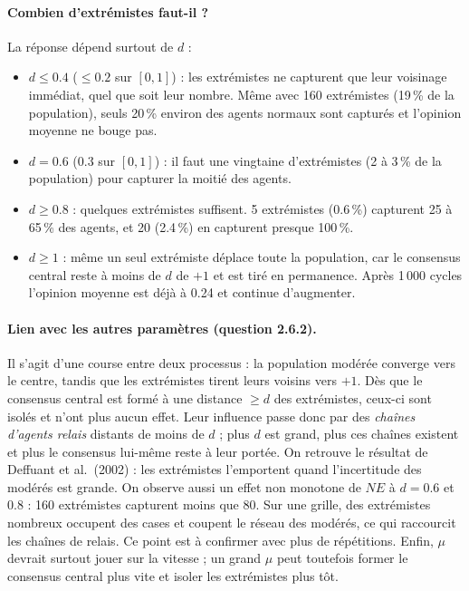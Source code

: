 \documentclass[11pt,a4paper]{article}
\begin{document}
\paragraph{Combien d'extrémistes faut-il ?} La réponse dépend surtout de $d$ :
\begin{itemize}
  \item \textbf{$d \le 0.4$} ($\le 0.2$ sur $[0,1]$) : les extrémistes ne capturent que leur
  voisinage immédiat, quel que soit leur nombre. Même avec 160 extrémistes (19\,\% de la
  population), seuls 20\,\% environ des agents normaux sont capturés et l'opinion moyenne
  ne bouge pas.
  \item \textbf{$d = 0.6$} ($0.3$ sur $[0,1]$) : il faut une vingtaine d'extrémistes (2 à 3\,\%
  de la population) pour capturer la moitié des agents.
  \item \textbf{$d \ge 0.8$} : quelques extrémistes suffisent. 5 extrémistes (0.6\,\%)
  capturent 25 à 65\,\% des agents, et 20 (2.4\,\%) en capturent presque 100\,\%.
  \item \textbf{$d \ge 1$} : même un seul extrémiste déplace toute la population, car le
  consensus central reste à moins de $d$ de $+1$ et est tiré en permanence. Après 1\,000
  cycles l'opinion moyenne est déjà à 0.24 et continue d'augmenter.
\end{itemize}

\paragraph{Lien avec les autres paramètres (question 2.6.2).} Il s'agit d'une course entre
deux processus : la population modérée converge vers le centre, tandis que les extrémistes
tirent leurs voisins vers $+1$. Dès que le consensus central est formé à une distance $\ge d$
des extrémistes, ceux-ci sont isolés et n'ont plus aucun effet. Leur influence passe donc par
des \emph{chaînes d'agents relais} distants de moins de $d$ ; plus $d$ est grand, plus ces
chaînes existent et plus le consensus lui-même reste à leur portée. On retrouve le résultat
de Deffuant et al.\ (2002) : les extrémistes l'emportent quand l'incertitude des modérés est
grande. On observe aussi un effet non monotone de $NE$ à $d = 0.6$ et $0.8$ : 160 extrémistes
capturent moins que 80. Sur une grille, des extrémistes nombreux occupent des cases et coupent
le réseau des modérés, ce qui raccourcit les chaînes de relais. Ce point est à confirmer
avec plus de répétitions. Enfin, $\mu$ devrait surtout jouer sur la vitesse ; un grand $\mu$
peut toutefois former le consensus central plus vite et isoler les extrémistes plus tôt.
\end{document}
